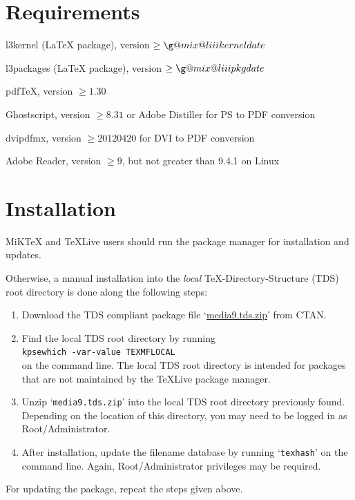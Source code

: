\documentclass[a4paper]{article}
\begin{document}
\section{Requirements}
\begin{trivlist}
\makeatletter
\item l3kernel (\LaTeX{} package), version $\ge \g@mix@liiikerneldate$
\item l3packages (\LaTeX{} package), version $\ge \g@mix@liiipkgdate$
\makeatother
\item pdf\TeX{}, version $\ge1.30$
\item Ghostscript, version $\ge8.31$ or Adobe Distiller for PS to PDF conversion
\item dvipdfmx, version $\ge 20120420$ for DVI to PDF conversion
\item Adobe Reader, version $\ge9$, but not greater than 9.4.1 on Linux
\end{trivlist}

\section{Installation}
MiK\TeX{} and \TeX{}Live users should run the package manager for installation and updates.

Otherwise, a manual installation into the \emph{local} TeX-Directory-Structure (TDS) root directory is done along the following steps:
\begin{enumerate}
  \item Download the TDS compliant package file `\href{http://mirror.ctan.org/install/macros/latex/contrib/media9.tds.zip}{media9.tds.zip}' from CTAN.
  \item Find the local TDS root directory by running\\
  {\tt\phantom{xx}kpsewhich -var-value TEXMFLOCAL}\\
  on the command line. The local TDS root directory is intended for packages that are not maintained by the \TeX{}Live package manager.
  \item Unzip `\verb+media9.tds.zip+' into the local TDS root directory previously found. Depending on the location of this directory, you may need to be logged in as Root/Administrator.
  \item After installation, update the filename database by running `{\tt texhash}' on the command line. Again, Root/Administrator privileges may be required.
\end{enumerate}
For updating the package, repeat the steps given above.
\end{document}
